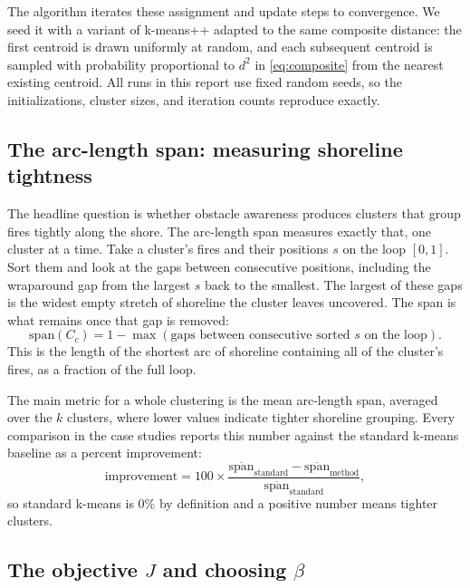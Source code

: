 \documentclass[11pt]{article}
\begin{document}
The algorithm iterates these assignment and update steps to convergence. We seed it with a variant of k-means++ adapted to the same composite distance: the first centroid is drawn uniformly at random, and each subsequent centroid is sampled with probability proportional to $d^2$ in \eqref{eq:composite} from the nearest existing centroid. All runs in this report use fixed random seeds, so the initializations, cluster sizes, and iteration counts reproduce exactly.
 
\subsection{The arc-length span: measuring shoreline tightness}
\label{sec:span}
 
The headline question is whether obstacle awareness produces clusters that group fires tightly along the shore. The arc-length span measures exactly that, one cluster at a time. Take a cluster's fires and their positions $s$ on the loop $[0,1]$. Sort them and look at the gaps between consecutive positions, including the wraparound gap from the largest $s$ back to the smallest. The largest of these gaps is the widest empty stretch of shoreline the cluster leaves uncovered. The span is what remains once that gap is removed:
\begin{equation}
\text{span}(C_c) = 1 - \max(\text{gaps between consecutive sorted } s \text{ on the loop}).
\label{eq:span}
\end{equation}
This is the length of the shortest arc of shoreline containing all of the cluster's fires, as a fraction of the full loop.
 
The main metric for a whole clustering is the mean arc-length span, averaged over the $k$ clusters, where lower values indicate tighter shoreline grouping. Every comparison in the case studies reports this number against the standard k-means baseline as a percent improvement:
\[
\text{improvement} = 100 \times \frac{\overline{\text{span}}_{\text{standard}} - \overline{\text{span}}_{\text{method}}}{\overline{\text{span}}_{\text{standard}}},
\]
so standard k-means is $0\%$ by definition and a positive number means tighter clusters.
 
\subsection{The objective \texorpdfstring{$J$}{J} and choosing \texorpdfstring{$\beta$}{beta}}
\label{sec:objective}
 
\end{document}

